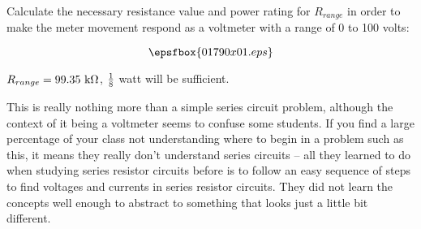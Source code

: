 

Calculate the necessary resistance value and power rating for $R_{range}$ in order to make the meter movement respond as a voltmeter with a range of 0 to 100 volts:

$$\epsfbox{01790x01.eps}$$







$R_{range} = 99.35 \hbox{ k} \Omega$, $1 \over 8$ watt will be sufficient.







This is really nothing more than a simple series circuit problem, although the context of it being a voltmeter seems to confuse some students.  If you find a large percentage of your class not understanding where to begin in a problem such as this, it means they really don't understand series circuits -- all they learned to do when studying series resistor circuits before is to follow an easy sequence of steps to find voltages and currents in series resistor circuits.  They did not learn the concepts well enough to abstract to something that looks just a little bit different.




